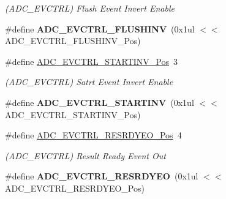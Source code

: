 \begin{DoxyCompactItemize}
\begin{DoxyCompactList}\small\item\em (A\+D\+C\+\_\+\+E\+V\+C\+T\+R\+L) Flush Event Invert Enable \end{DoxyCompactList}\item 
\hypertarget{group___s_a_m_l21___a_d_c_ga38fb12cfe881ff6df7a6046f63be7ea1}{}\#define {\bfseries A\+D\+C\+\_\+\+E\+V\+C\+T\+R\+L\+\_\+\+F\+L\+U\+S\+H\+I\+N\+V}~(0x1ul $<$$<$ A\+D\+C\+\_\+\+E\+V\+C\+T\+R\+L\+\_\+\+F\+L\+U\+S\+H\+I\+N\+V\+\_\+\+Pos)\label{group___s_a_m_l21___a_d_c_ga38fb12cfe881ff6df7a6046f63be7ea1}

\item 
\hypertarget{group___s_a_m_l21___a_d_c_gafb19da28a4e8484bb02d42e69c09c664}{}\#define \hyperlink{group___s_a_m_l21___a_d_c_gafb19da28a4e8484bb02d42e69c09c664}{A\+D\+C\+\_\+\+E\+V\+C\+T\+R\+L\+\_\+\+S\+T\+A\+R\+T\+I\+N\+V\+\_\+\+Pos}~3\label{group___s_a_m_l21___a_d_c_gafb19da28a4e8484bb02d42e69c09c664}

\begin{DoxyCompactList}\small\item\em (A\+D\+C\+\_\+\+E\+V\+C\+T\+R\+L) Satrt Event Invert Enable \end{DoxyCompactList}\item 
\hypertarget{group___s_a_m_l21___a_d_c_gababc361949f13ffc10ffb916489e8d7c}{}\#define {\bfseries A\+D\+C\+\_\+\+E\+V\+C\+T\+R\+L\+\_\+\+S\+T\+A\+R\+T\+I\+N\+V}~(0x1ul $<$$<$ A\+D\+C\+\_\+\+E\+V\+C\+T\+R\+L\+\_\+\+S\+T\+A\+R\+T\+I\+N\+V\+\_\+\+Pos)\label{group___s_a_m_l21___a_d_c_gababc361949f13ffc10ffb916489e8d7c}

\item 
\hypertarget{group___s_a_m_l21___a_d_c_ga20243ed239f2fe8a42ad79d1d8414415}{}\#define \hyperlink{group___s_a_m_l21___a_d_c_ga20243ed239f2fe8a42ad79d1d8414415}{A\+D\+C\+\_\+\+E\+V\+C\+T\+R\+L\+\_\+\+R\+E\+S\+R\+D\+Y\+E\+O\+\_\+\+Pos}~4\label{group___s_a_m_l21___a_d_c_ga20243ed239f2fe8a42ad79d1d8414415}

\begin{DoxyCompactList}\small\item\em (A\+D\+C\+\_\+\+E\+V\+C\+T\+R\+L) Result Ready Event Out \end{DoxyCompactList}\item 
\hypertarget{group___s_a_m_l21___a_d_c_ga9755edb80d059059aaa744cffe99bf76}{}\#define {\bfseries A\+D\+C\+\_\+\+E\+V\+C\+T\+R\+L\+\_\+\+R\+E\+S\+R\+D\+Y\+E\+O}~(0x1ul $<$$<$ A\+D\+C\+\_\+\+E\+V\+C\+T\+R\+L\+\_\+\+R\+E\+S\+R\+D\+Y\+E\+O\+\_\+\+Pos)\label{group___s_a_m_l21___a_d_c_ga9755edb80d059059aaa744cffe99bf76}


\end{DoxyCompactItemize}
